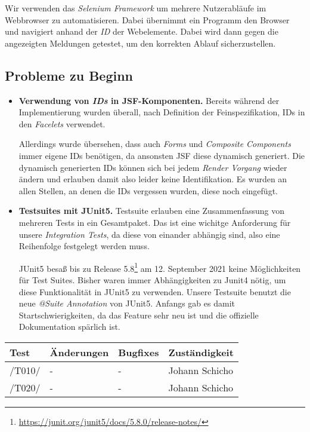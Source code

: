 
Wir verwenden das \emph{Selenium Framework} um mehrere Nutzerabläufe im Webbrowser zu automatisieren.
Dabei übernimmt ein Programm den Browser und navigiert anhand der \emph{ID}
der Webelemente. Dabei wird dann gegen die angezeigten Meldungen getestet, um
den korrekten Ablauf sicherzustellen.

\subsection{Probleme zu Beginn}

\begin{itemize}
	\item \textbf{Verwendung von \emph{IDs} in JSF-Komponenten.} Bereits während der
	Implementierung wurden überall, nach Definition der Feinspezifikation, IDs in den \emph{Facelets} verwendet.

	Allerdings wurde übersehen, dass auch \emph{Forms} und \emph{Composite Components} immer eigene IDs benötigen, da ansonsten JSF diese dynamisch
	generiert. Die dynamisch generierten IDs können sich bei jedem \emph{Render Vorgang} wieder ändern und erlauben damit also leider keine Identifikation.\newline
	Es wurden an allen Stellen, an denen die IDs vergessen wurden, diese noch eingefügt.

	\item \textbf{Testsuites mit JUnit5.} Testsuite erlauben eine Zusammenfassung von mehreren Tests in ein Gesamtpaket. Das ist eine wichitge
	Anforderung für unsere \emph{Integration Tests}, da diese von einander abhängig sind, also eine Reihenfolge festgelegt werden muss.

	JUnit5 besaß bis zu Release 5.8\footnote{\url{https://junit.org/junit5/docs/5.8.0/release-notes/}}
	am 12. September 2021 keine Möglichkeiten für Test Suites. Bisher waren immer Abhängigkeiten zu Junit4 nötig, um diese
	Funktionalität in JUnit5 zu verwenden. Unsere Testsuite benutzt die neue
	\emph{@Suite Annotation} von JUnit5. Anfangs gab es damit Startschwierigkeiten, da das Feature sehr neu ist und die offizielle
	Dokumentation spärlich ist.
\end{itemize}

\begin{table}
	\centering
	\begin{tabular}{m{1.2cm}|m{4.5cm}|m{4.5cm}|l}
		\toprule
		\textbf{Test} & \textbf{Änderungen} & \textbf{Bugfixes} & \textbf{Zuständigkeit} \\\midrule
		/T010/ & - & - & Johann Schicho \\\midrule
		/T020/ & - & - & Johann Schicho \\
	\end{tabular}
\end{table}

